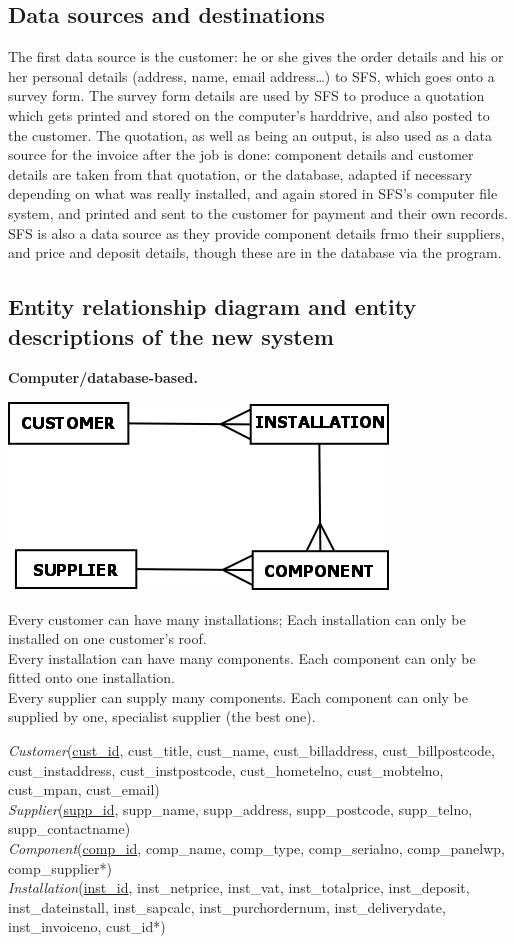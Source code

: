 		\subsection{Data sources and destinations}
The first data source is the customer: he or she gives the order details and his or her personal details (address, name, email address\ldots) to SFS, which goes onto a survey form.  The survey form details are used by SFS to produce a quotation which gets printed and stored on the computer's harddrive, and also posted to the customer.  The quotation, as well as being an output, is also used as a data source for the invoice after the job is done: component details and customer details are taken from that quotation, or the database, adapted if necessary depending on what was really installed, and again stored in SFS's computer file system, and printed and sent to the customer for payment and their own records.  SFS is also a data source as they provide component details frmo their suppliers, and price and deposit details, though these are in the database via the program.
		\subsection{Entity relationship diagram and entity descriptions of the new system}
\textbf{Computer\slash database-based.}

\includegraphics[scale=0.45]{erd_new}

Every customer can have many installations; Each installation can only be
installed on one customer's roof.\\
Every installation can have many components. Each component can only be
fitted onto one installation.\\
Every supplier can supply many components.  Each component can only be
supplied by one, specialist supplier (the best one).

\textit{Customer}(\underline{cust\_id}, cust\_title, cust\_name, cust\_billaddress, cust\_billpostcode, cust\_instaddress, cust\_instpostcode, cust\_hometelno, cust\_mobtelno, cust\_mpan, cust\_email)\\
\textit{Supplier}(\underline{supp\_id}, supp\_name, supp\_address, supp\_postcode, supp\_telno, supp\_contactname)\\
\textit{Component}(\underline{comp\_id}, comp\_name, comp\_type, comp\_serialno, comp\_panelwp, comp\_supplier*)\\
\textit{Installation}(\underline{inst\_id}, inst\_netprice, inst\_vat, inst\_totalprice, inst\_deposit, inst\_dateinstall, inst\_sapcalc, inst\_purchordernum, inst\_deliverydate, inst\_invoiceno, cust\_id*)

